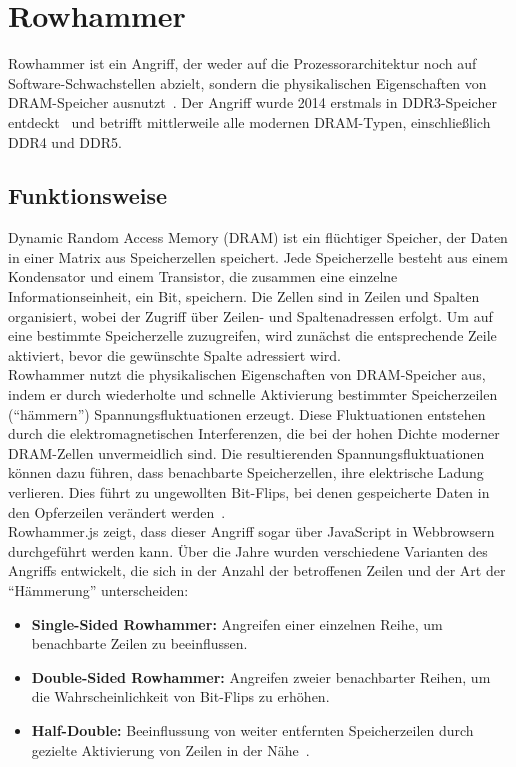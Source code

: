 \section{Rowhammer}
\label{sec:rowhammer}
Rowhammer ist ein Angriff, der weder auf die Prozessorarchitektur noch auf Software-Schwachstellen abzielt, sondern die physikalischen Eigenschaften von DRAM-Speicher ausnutzt~\cite{mutlu2019rowhammer}.
Der Angriff wurde 2014 erstmals in DDR3-Speicher entdeckt~\cite{kim2014flipping} und betrifft mittlerweile alle modernen DRAM-Typen, einschließlich DDR4 und DDR5.

\subsection{Funktionsweise}
\label{subsec:rowhammer_funktionsweise}
Dynamic Random Access Memory (DRAM) ist ein flüchtiger Speicher, der Daten in einer Matrix aus Speicherzellen speichert.
Jede Speicherzelle besteht aus einem Kondensator und einem Transistor, die zusammen eine einzelne Informationseinheit, ein Bit, speichern.
Die Zellen sind in Zeilen und Spalten organisiert, wobei der Zugriff über Zeilen- und Spaltenadressen erfolgt.
Um auf eine bestimmte Speicherzelle zuzugreifen, wird zunächst die entsprechende Zeile aktiviert, bevor die gewünschte Spalte adressiert wird. \\
Rowhammer nutzt die physikalischen Eigenschaften von DRAM-Speicher aus, indem er durch wiederholte und schnelle Aktivierung bestimmter Speicherzeilen (\enquote{hämmern}) Spannungsfluktuationen erzeugt.
Diese Fluktuationen entstehen durch die elektromagnetischen Interferenzen, die bei der hohen Dichte moderner DRAM-Zellen unvermeidlich sind.
Die resultierenden Spannungsfluktuationen können dazu führen, dass benachbarte Speicherzellen, ihre elektrische Ladung verlieren.
Dies führt zu ungewollten Bit-Flips, bei denen gespeicherte Daten in den Opferzeilen verändert werden~\cite{mutlu2019rowhammer}. \\
Rowhammer.js zeigt, dass dieser Angriff sogar über JavaScript in Webbrowsern durchgeführt werden kann.
Über die Jahre wurden verschiedene Varianten des Angriffs entwickelt, die sich in der Anzahl der betroffenen Zeilen und der Art der \enquote{Hämmerung} unterscheiden:
\begin{itemize}
    \itemsep0em
    \item \textbf{Single-Sided Rowhammer:} Angreifen einer einzelnen Reihe, um benachbarte Zeilen zu beeinflussen.
    \item \textbf{Double-Sided Rowhammer:} Angreifen zweier benachbarter Reihen, um die Wahrscheinlichkeit von Bit-Flips zu erhöhen.
    \item \textbf{Half-Double:} Beeinflussung von weiter entfernten Speicherzeilen durch gezielte Aktivierung von Zeilen in der Nähe~\cite{qazi2021half_double}.
\end{itemize}

